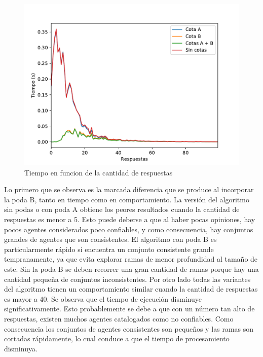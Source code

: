 \documentclass{article}
\begin{document}
\begin{figure}[h]
\caption{Tiempo en funcion de la cantidad de respuestas}
\centering
\includegraphics[scale=0.5]{Respuestas_st.pdf}
\end{figure}

Lo primero que se observa es la marcada diferencia que se produce al incorporar la poda B, tanto en tiempo como en comportamiento. La versión del algoritmo sin podas o con poda A obtiene los peores resultados cuando la cantidad de respuestas es menor a 5. Esto puede deberse a que al haber pocas opiniones, hay pocos agentes considerados poco confiables, y como consecuencia, hay conjuntos grandes de agentes que son consistentes. El algoritmo con poda B es particularmente rápido si encuentra un conjunto consistente grande tempranamente, ya que evita explorar ramas de menor profundidad al tamaño de este. Sin la poda B se deben recorrer una gran cantidad de ramas porque hay una cantidad pequeña de conjuntos inconsistentes. Por otro lado todas las variantes del algoritmo tienen un comportamiento similar cuando la cantidad de respuestas es mayor a 40. Se observa que el tiempo de ejecución disminuye significativamente. Esto probablemente se debe a que con un número tan alto de respuestas, existen muchos agentes catalogados como no confiables. Como consecuencia los conjuntos de agentes consistentes son pequeños y las ramas son cortadas rápidamente, lo cual conduce a que el tiempo de procesamiento disminuya.
\end{document}
